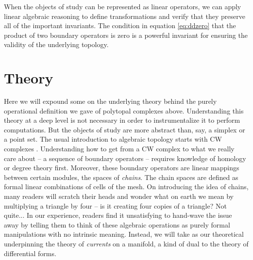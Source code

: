 \documentclass[twocolumn]{article}
\begin{document}
When the objects of study can be represented as linear operators, we can apply linear algebraic reasoning to define transformations and verify that they preserve all of the important invariants.
The condition in equation \eqref{eq:ddzero} that the product of two boundary operators is zero is a powerful invariant for ensuring the validity of the underlying topology.


\appendix
\section{Theory}

Here we will expound some on the underlying theory behind the purely operational definition we gave of polytopal complexes above.
Understanding this theory at a deep level is not necessary in order to instrumentalize it to perform computations.
But the objects of study are more abstract than, say, a simplex or a point set.
The usual introduction to algebraic topology starts with CW complexes \cite{hatcher2002algebraic}.
Understanding how to get from a CW complex to what we really care about -- a sequence of boundary operators -- requires knowledge of homology or degree theory first.
Moreover, these boundary operators are linear mappings between certain modules, the spaces of \emph{chains}.
The chain spaces are defined as formal linear combinations of cells of the mesh.
On introducing the idea of chains, many readers will scratch their heads and wonder what on earth we mean by multiplying a triangle by four -- is it creating four copies of a triangle?
Not quite...
In our experience, readers find it unsatisfying to hand-wave the issue away by telling them to think of these algebraic operations as purely formal manipulations with no intrinsic meaning.
Instead, we will take as our theoretical underpinning the theory of \emph{currents} on a manifold, a kind of dual to the theory of differential forms.
\end{document}
